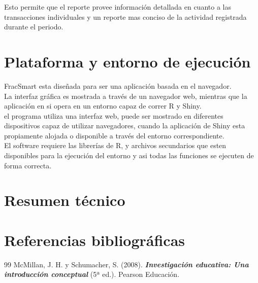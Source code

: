 \documentclass{article}
\begin{document}
\quad\quad Esto permite que el reporte provee información detallada en cuanto a las transacciones individuales y un reporte mas conciso de la actividad registrada durante el periodo.


\newpage
\section{Plataforma y entorno de ejecución}
\quad\quad FracSmart esta diseñada para ser una aplicación basada en el navegador. \\

\quad\quad La interfaz gráfica es mostrada a través de un navegador web, mientras que la aplicación en si opera en un entorno capaz de correr R y Shiny. \\

\quad\quadPorque el programa utiliza una interfaz web, puede ser mostrado en diferentes dispositivos capaz de utilizar navegadores, cuando la aplicación de Shiny esta propiamente alojada o disponible a través del entorno correspondiente.\\

\quad\quad El software requiere las librerías de R, y archivos secundarios que esten disponibles para la ejecución del entorno y asi todas las funciones se ejecuten de forma correcta.


\newpage
\section{Resumen técnico}
\quad\quad 


\newpage
\section{Referencias bibliográficas}

    \begin{thebibliography}{99}
        McMillan, J. H. y Schumacher, S. (2008). \textbf{\textit{Investigación educativa: Una introducción conceptual}} (5ª ed.). Pearson Educación.
    
    \end{thebibliography}
\end{document}
